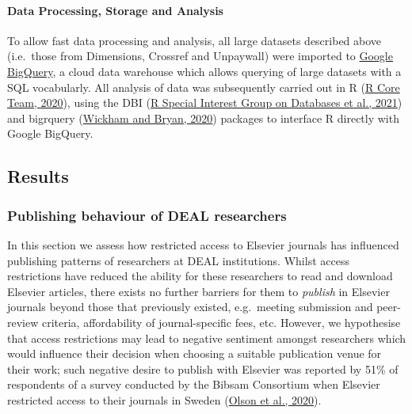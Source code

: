 \documentclass[
]{article}
\begin{document}
\hypertarget{data-processing-storage-and-analysis}{%
\paragraph{Data Processing, Storage and Analysis}\label{data-processing-storage-and-analysis}}

To allow fast data processing and analysis, all large datasets described above (i.e.~those from Dimensions, Crossref and Unpaywall) were imported to \href{https://cloud.google.com/bigquery}{Google BigQuery}, a cloud data warehouse which allows querying of large datasets with a SQL vocabularly. All analysis of data was subsequently carried out in R (\href{http://www.R-project.org/}{R Core Team, 2020}), using the DBI (\href{https://CRAN.R-project.org/package=DBI}{R Special Interest Group on Databases et al., 2021}) and bigrquery (\href{https://CRAN.R-project.org/package=bigrquery}{Wickham and Bryan, 2020}) packages to interface R directly with Google BigQuery.

\hypertarget{results}{%
\subsection{Results}\label{results}}

\hypertarget{publishing-behaviour-of-deal-researchers}{%
\subsubsection{Publishing behaviour of DEAL researchers}\label{publishing-behaviour-of-deal-researchers}}

In this section we assess how restricted access to Elsevier journals has influenced publishing patterns of researchers at DEAL institutions. Whilst access restrictions have reduced the ability for these researchers to read and download Elsevier articles, there exists no further barriers for them to \emph{publish} in Elsevier journals beyond those that previously existed, e.g.~meeting submission and peer-review criteria, affordability of journal-specific fees, etc. However, we hypothesise that access restrictions may lead to negative sentiment amongst researchers which would influence their decision when choosing a suitable publication venue for their work; such negative desire to publish with Elsevier was reported by 51\% of respondents of a survey conducted by the Bibsam Consortium when Elsevier restricted access to their journals in Sweden (\href{http://doi.org/10.1629/uksg.507}{Olson et al., 2020}).
\end{document}

